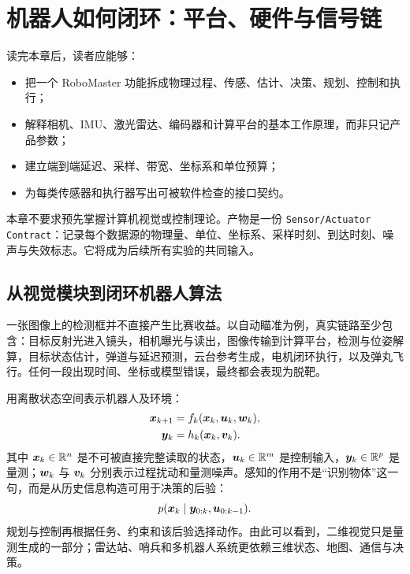 \chapter{机器人如何闭环：平台、硬件与信号链}
\label{ch:closed-loop-hardware}

\begin{learningobjectives}
读完本章后，读者应能够：
\begin{itemize}
  \item 把一个 RoboMaster 功能拆成物理过程、传感、估计、决策、规划、控制和执行；
  \item 解释相机、IMU、激光雷达、编码器和计算平台的基本工作原理，而非只记产品参数；
  \item 建立端到端延迟、采样、带宽、坐标系和单位预算；
  \item 为每类传感器和执行器写出可被软件检查的接口契约。
\end{itemize}
\end{learningobjectives}

\begin{prerequisites}
本章不要求预先掌握计算机视觉或控制理论。产物是一份 \texttt{Sensor/Actuator Contract}：记录每个数据源的物理量、单位、坐标系、采样时刻、到达时刻、噪声与失效标志。它将成为后续所有实验的共同输入。
\end{prerequisites}

\section{从视觉模块到闭环机器人算法}

一张图像上的检测框并不直接产生比赛收益。以自动瞄准为例，真实链路至少包含：目标反射光进入镜头，相机曝光与读出，图像传输到计算平台，检测与位姿解算，目标状态估计，弹道与延迟预测，云台参考生成，电机闭环执行，以及弹丸飞行。任何一段出现时间、坐标或模型错误，最终都会表现为脱靶。

用离散状态空间表示机器人及环境：
\begin{align}
  \bm{x}_{k+1} &= f_k(\bm{x}_k,\bm{u}_k,\bm{w}_k), \\
  \bm{y}_k &= h_k(\bm{x}_k,\bm{v}_k).
\end{align}
其中 $\bm{x}_k\in\mathbb{R}^n$ 是不可被直接完整读取的状态，$\bm{u}_k\in\mathbb{R}^m$ 是控制输入，$\bm{y}_k\in\mathbb{R}^p$ 是量测；$\bm{w}_k$ 与 $\bm{v}_k$ 分别表示过程扰动和量测噪声。感知的作用不是“识别物体”这一句，而是从历史信息构造可用于决策的后验：
\begin{equation}
  p(\bm{x}_k\mid \bm{y}_{0:k},\bm{u}_{0:k-1}).
\end{equation}
规划与控制再根据任务、约束和该后验选择动作。由此可以看到，二维视觉只是量测生成的一部分；雷达站、哨兵和多机器人系统更依赖三维状态、地图、通信与决策。

